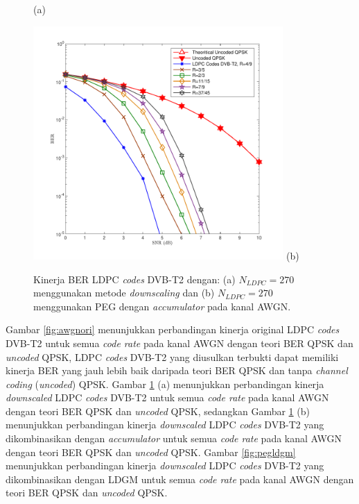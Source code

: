 \begin{figure}[H]
\begin{minipage}{1\linewidth}
		\center  (a)
	\end{minipage}
	\hfill
	\begin{minipage}{1\linewidth}
		\hspace{0.75 cm}
		\includegraphics[width=0.85\textwidth]{hasilpegawgnfix.pdf}
		\vspace{-1cm}
		\center (b)
	\end{minipage}
	\caption {Kinerja BER LDPC \textit{codes} DVB-T2 dengan: (a) $N_{LDPC}=270$ menggunakan metode \textit{downscaling} dan (b) $N_{LDPC}=270$ menggunakan PEG dengan \textit{accumulator} pada kanal AWGN.}
	\label{gambar:dspeg}
\end{figure}

Gambar \ref{fig:awgnori} menunjukkan perbandingan kinerja original LDPC \textit{codes} DVB-T2 untuk semua \textit{code rate} pada kanal AWGN dengan teori BER QPSK dan \textit{uncoded} QPSK, LDPC \textit{codes} DVB-T2 yang diusulkan terbukti dapat memiliki kinerja BER yang jauh lebih baik daripada teori BER QPSK dan tanpa \textit{channel coding} (\textit{uncoded}) QPSK. Gambar \ref{gambar:dspeg} (a) menunjukkan perbandingan kinerja \textit{downscaled} LDPC \textit{codes} DVB-T2 untuk semua \textit{code rate} pada kanal AWGN dengan teori BER QPSK dan \textit{uncoded} QPSK, sedangkan Gambar \ref{gambar:dspeg} (b) menunjukkan perbandingan kinerja \textit{downscaled} LDPC \textit{codes} DVB-T2 yang dikombinasikan dengan \textit{accumulator} untuk semua \textit{code rate} pada kanal AWGN dengan teori BER QPSK dan \textit{uncoded} QPSK. Gambar \ref{fig:pegldgm} menunjukkan perbandingan kinerja \textit{downscaled} LDPC \textit{codes} DVB-T2 yang dikombinasikan dengan LDGM untuk semua \textit{code rate} pada kanal AWGN dengan teori BER QPSK dan \textit{uncoded} QPSK.


